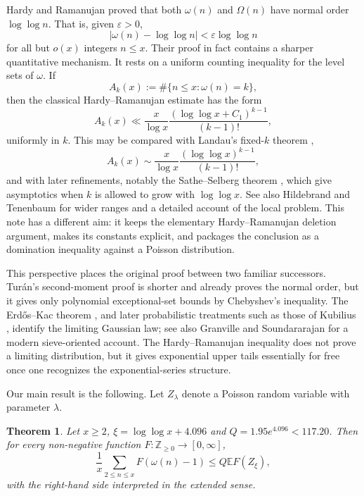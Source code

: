 \documentclass[12pt,a4paper,reqno]{amsart}
\theoremstyle{plain}
\newtheorem{thrm}{Theorem}[section]
\numberwithin{sblmm}{thrm}
\numberwithin{equation}{section}
\begin{document}
Hardy and Ramanujan \cite{HardyRamanujan1917} proved that both $\omega(n)$ and $\Omega(n)$ have normal order $\log\log n$. That is, given $\varepsilon>0$,
$$|\omega(n)-\log\log n|<\varepsilon\log\log n$$ for all but $o(x)$ integers $n\le x$.
Their proof in fact contains a sharper quantitative mechanism. It rests on a uniform counting inequality for the level sets of $\omega$. If
$$A_k(x):=\#\{n\le x:\omega(n)=k\},$$
then the classical Hardy--Ramanujan estimate has the form
\begin{equation*}
    A_k(x)\ll\frac{x}{\log x}\frac{(\log\log x+C_1)^{k-1}}{(k-1)!},
\end{equation*}
uniformly in $k$. This may be compared with Landau's fixed-$k$ theorem \cite{Landau1909},
$$A_k(x)\sim \frac{x}{\log x}\frac{(\log\log x)^{k-1}}{(k-1)!},$$
and with later refinements, notably the Sathe--Selberg theorem \cite{Sathe1953,Selberg1954}, which give asymptotics when $k$ is allowed to grow with $\log\log x$. See also Hildebrand and Tenenbaum \cite{HildebrandTenenbaum1988} for wider ranges and a detailed account of the local problem. This note has a different aim: it keeps the elementary Hardy--Ramanujan deletion argument, makes its constants explicit, and packages the conclusion as a domination inequality against a Poisson distribution.

This perspective places the original proof between two familiar successors. Tur\'{a}n's second-moment proof \cite{Turan1934} is shorter and already proves the normal order, but it gives only polynomial exceptional-set bounds by Chebyshev's inequality. The Erd\H{o}s--Kac theorem \cite{ErdosKac1940}, and later probabilistic treatments such as those of Kubilius \cite{Kubilius1964}, identify the limiting Gaussian law; see also Granville and Soundararajan \cite{GranvilleSoundararajan2007} for a modern sieve-oriented account. The Hardy--Ramanujan inequality does not prove a limiting distribution, but it gives exponential upper tails essentially for free once one recognizes the exponential-series structure.

Our main result is the following. Let $Z_{\lambda}$ denote a Poisson random variable with parameter $\lambda$.

\begin{thrm}\label{thm:effective_HR_ineq}
    Let $x\ge 2$, $\xi=\log\log x+4.096$ and $Q=1.95e^{4.096}<117.20$. Then for every non-negative function $F:\mathbb{Z}_{\ge 0}\to [0,\infty]$,
    \begin{equation}\label{eqn:thm_ineq}
        \frac{1}{x}\sum_{2\le n\le x}F(\omega(n)-1)\le Q\mathbb{E}F(Z_{\xi}),
    \end{equation}
    with the right-hand side interpreted in the extended sense.
\end{thrm}
\end{document}
